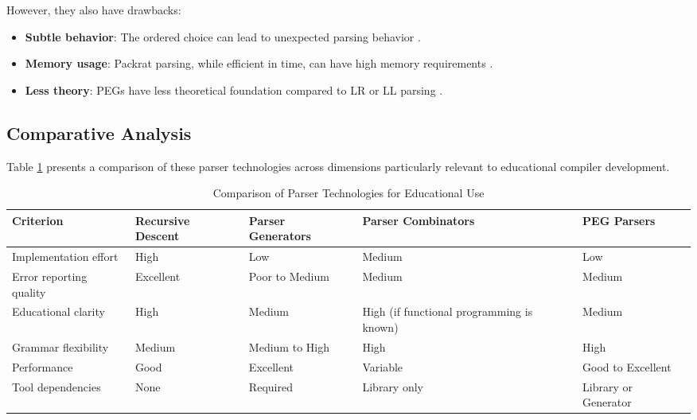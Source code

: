 However, they also have drawbacks:
\begin{itemize}
    \item \textbf{Subtle behavior}: The ordered choice can lead to unexpected parsing behavior \cite{tratt2010parsing}.
    \item \textbf{Memory usage}: Packrat parsing, while efficient in time, can have high memory requirements \cite{ford2002packrat}.
    \item \textbf{Less theory}: PEGs have less theoretical foundation compared to LR or LL parsing \cite{medeiros2014peg}.
\end{itemize}

\subsection{Comparative Analysis}

Table \ref{tab:parser-comparison} presents a comparison of these parser technologies across dimensions particularly relevant to educational compiler development.

\begin{table}[ht!]
    \centering
    \renewcommand{\arraystretch}{1.2}
    \caption{Comparison of Parser Technologies for Educational Use}
    \label{tab:parser-comparison}
    \begin{tabularx}{\textwidth}{|
        >{\raggedright\arraybackslash}X|
        >{\centering\arraybackslash}X|
        >{\centering\arraybackslash}X|
        >{\centering\arraybackslash}X|
        >{\centering\arraybackslash}X|
      }
      \hline
      \textbf{Criterion} & \textbf{Recursive Descent} & \textbf{Parser Generators} & \textbf{Parser Combinators} & \textbf{PEG Parsers} \\
      \hline
      Implementation effort     & High                     & Low                       & Medium                        & Low                    \\
      \hline
      Error reporting quality   & Excellent                & Poor to Medium            & Medium                        & Medium                 \\
      \hline
      Educational clarity       & High                     & Medium                    & High (if functional programming is known) & Medium  \\
      \hline
      Grammar flexibility       & Medium                   & Medium to High            & High                          & High                   \\
      \hline
      Performance               & Good                     & Excellent                 & Variable                      & Good to Excellent      \\
      \hline
      Tool dependencies         & None                     & Required                  & Library only                  & Library or Generator   \\
      \hline
    \end{tabularx}
\end{table}  
  

